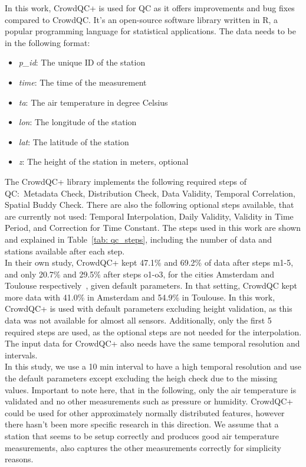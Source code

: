 In this work, CrowdQC+ is used for QC as it offers improvements and bug fixes compared to CrowdQC. It's an open-source software library written in R, a popular programming language for statistical applications. The data needs to be in the following format:

\begin{itemize}
    \item \textit{p\_id}: The unique ID of the station
    \item \textit{time}: The time of the measurement
    \item \textit{ta}: The air temperature in degree Celsius
    \item \textit{lon}: The longitude of the station
    \item \textit{lat}: The latitude of the station
    \item \textit{z}: The height of the station in meters, optional
\end{itemize}

The CrowdQC+ library implements the following required steps of QC:\ Metadata Check, Distribution Check, Data Validity, Temporal Correlation, Spatial Buddy Check. There are also the following optional steps available, that are currently not used: Temporal Interpolation, Daily Validity, Validity in Time Period, and Correction for Time Constant.
The steps used in this work are shown and explained in Table~\ref{tab: qc_steps}, including the number of data and stations available after each step.\\
In their own study, CrowdQC+ kept 47.1\% and 69.2\% of data after steps m1-5, and only 20.7\% and 29.5\% after steps o1-o3, for the cities Amsterdam and Toulouse respectively~\cite{fenner2021crowdqc+}, given default parameters. In that setting, CrowdQC kept more data with 41.0\% in Amsterdam and 54.9\% in Toulouse. In this work, CrowdQC+ is used with default parameters excluding height validation, as this data was not available for almost all sensors. Additionally, only the first 5 required steps are used, as the optional steps are not needed for the interpolation. The input data for CrowdQC+ also needs have the same temporal resolution and intervals.\\
In this study, we use a 10 min interval to have a high temporal resolution and use the default parameters except excluding the heigh check due to the missing values. Important to note here, that in the following, only the air temperature is validated and no other measurements such as pressure or humidity. CrowdQC+ could be used for other approximately normally distributed features, however there hasn't been more specific research in this direction. We assume that a station that seems to be setup correctly and produces good air temperature measurements, also captures the other measurements correctly for simplicity reasons.

